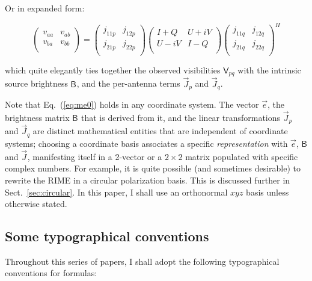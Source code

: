 \documentclass[referee]{aa}
\newcommand{\herm}{H}
\newcommand{\jones}[2]{\vec {#1}_{#2}}
\newcommand{\coh}[2]{\mathsf{{#1}}_{{#2}}}
\begin{document}
Or in expanded form:

\[
    \left( 
    \begin{array}{cc}
    v_{aa} & v_{ab} \\
    v_{ba} & v_{bb} \\
    \end{array}
    \right) = 
    \left( 
    \begin{array}{cc}
    j_{11p} & j_{12p} \\
    j_{21p} & j_{22p} \\
    \end{array}
    \right) 
    \left( 
    \begin{array}{cc}
    I+Q & U+iV \\
    U-iV & I-Q \\
    \end{array}
    \right) 
    \left( 
    \begin{array}{cc}
    j_{11q} & j_{12q} \\
    j_{21q} & j_{22q} \\
    \end{array}
    \right)^\herm
\]

which quite elegantly ties together the observed visibilities $\coh{V}{pq}$ with the intrinsic source brightness $\coh{B}{}$, and the per-antenna terms $\jones{J}{p}$ and $\jones{J}{q}$.

Note that Eq.~(\ref{eq:me0}) holds in any coordinate system. The vector $\vec e$, the brightness matrix $\coh{B}{}$ that is derived from it, and the linear transformations $\jones{J}{p}$ and $\jones{J}{q}$ are distinct mathematical entities that are independent of coordinate systems; choosing a coordinate basis associates a specific {\em representation} with $\vec e$,  $\coh{B}{}$ and $\jones{J}{}$, manifesting itself in a 2-vector or a $2\times2$ matrix populated with specific complex numbers. For example, it is quite possible (and sometimes desirable) to rewrite the RIME in a circular polarization basis. This is discussed further in Sect.~\ref{sec:circular}. In this paper, I shall use an orthonormal $xyz$ basis unless otherwise stated.

\subsection{Some typographical conventions}

Throughout this series of papers, I shall adopt the following typographical conventions for formulas:
\end{document}
